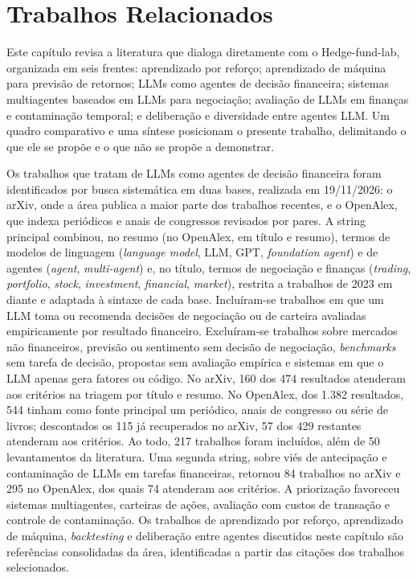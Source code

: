 \chapter{Trabalhos Relacionados}
\label{cha:relacionados}

Este capítulo revisa a literatura que dialoga diretamente com o Hedge-fund-lab, organizada em seis frentes: aprendizado por reforço; aprendizado de máquina para previsão de retornos; LLMs como agentes de decisão financeira; sistemas multiagentes baseados em LLMs para negociação; avaliação de LLMs em finanças e contaminação temporal; e deliberação e diversidade entre agentes LLM. Um quadro comparativo e uma síntese posicionam o presente trabalho, delimitando o que ele se propõe e o que não se propõe a demonstrar.

Os trabalhos que tratam de LLMs como agentes de decisão financeira foram identificados por busca sistemática em duas bases, realizada em 19/11/2026: o arXiv, onde a área publica a maior parte dos trabalhos recentes, e o OpenAlex, que indexa periódicos e anais de congressos revisados por pares. A string principal combinou, no resumo (no OpenAlex, em título e resumo), termos de modelos de linguagem (\textit{language model}, LLM, GPT, \textit{foundation agent}) e de agentes (\textit{agent}, \textit{multi-agent}) e, no título, termos de negociação e finanças (\textit{trading}, \textit{portfolio}, \textit{stock}, \textit{investment}, \textit{financial}, \textit{market}), restrita a trabalhos de 2023 em diante e adaptada à sintaxe de cada base. Incluíram-se trabalhos em que um LLM toma ou recomenda decisões de negociação ou de carteira avaliadas empiricamente por resultado financeiro. Excluíram-se trabalhos sobre mercados não financeiros, previsão ou sentimento sem decisão de negociação, \textit{benchmarks} sem tarefa de decisão, propostas sem avaliação empírica e sistemas em que o LLM apenas gera fatores ou código. No arXiv, 160 dos 474 resultados atenderam aos critérios na triagem por título e resumo. No OpenAlex, dos 1.382 resultados, 544 tinham como fonte principal um periódico, anais de congresso ou série de livros; descontados os 115 já recuperados no arXiv, 57 dos 429 restantes atenderam aos critérios. Ao todo, 217 trabalhos foram incluídos, além de 50 levantamentos da literatura. Uma segunda string, sobre viés de antecipação e contaminação de LLMs em tarefas financeiras, retornou 84 trabalhos no arXiv e 295 no OpenAlex, dos quais 74 atenderam aos critérios. A priorização favoreceu sistemas multiagentes, carteiras de ações, avaliação com custos de transação e controle de contaminação. Os trabalhos de aprendizado por reforço, aprendizado de máquina, \textit{backtesting} e deliberação entre agentes discutidos neste capítulo são referências consolidadas da área, identificadas a partir das citações dos trabalhos selecionados.

